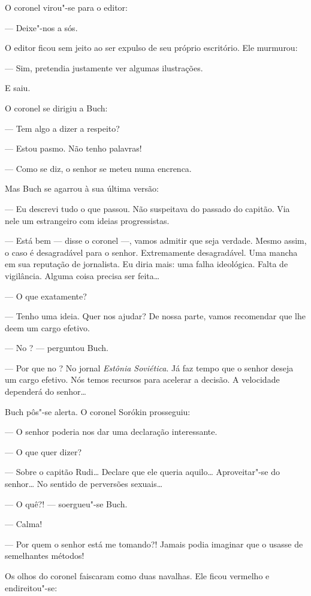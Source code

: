 O coronel virou"-se para o editor:

--- Deixe"-nos a sós.

O editor ficou sem jeito ao ser expulso de seu próprio escritório. Ele
murmurou:

--- Sim, pretendia justamente ver algumas ilustrações.

E saiu.

O coronel se dirigiu a Buch:

--- Tem algo a dizer a respeito?

--- Estou pasmo. Não tenho palavras!

--- Como se diz, o senhor se meteu numa encrenca.

Mas Buch se agarrou à sua última versão:

--- Eu descrevi tudo o que passou. Não suspeitava do passado do capitão.
Via nele um estrangeiro com ideias progressistas.

--- Está bem --- disse o coronel ---, vamos admitir que seja verdade.
Mesmo assim, o caso é desagradável para o senhor. Extremamente
desagradável. Uma mancha em sua reputação de jornalista. Eu diria mais:
uma falha ideológica. Falta de vigilância. Alguma coisa precisa ser
feita\ldots{}

--- O que exatamente?

--- Tenho uma ideia. Quer nos ajudar? De nossa parte, vamos recomendar
que lhe deem um cargo efetivo.

--- No ? --- perguntou Buch.

--- Por que no ? No jornal \emph{Estônia Soviética}. Já faz tempo que
o senhor deseja um cargo efetivo. Nós temos recursos para acelerar a
decisão. A velocidade dependerá do senhor\ldots{}

Buch pôs"-se alerta. O coronel Sorókin prosseguiu:

--- O senhor poderia nos dar uma declaração interessante.

--- O que quer dizer?

--- Sobre o capitão Rudi\ldots{} Declare que ele queria aquilo\ldots{}
Aproveitar"-se do senhor\ldots{} No sentido de perversões sexuais\ldots{}

--- O quê?! --- soergueu"-se Buch.

--- Calma!

--- Por quem o senhor está me tomando?! Jamais podia imaginar que o 
usasse de semelhantes métodos!

Os olhos do coronel faiscaram como duas navalhas. Ele ficou vermelho e
endireitou"-se:

